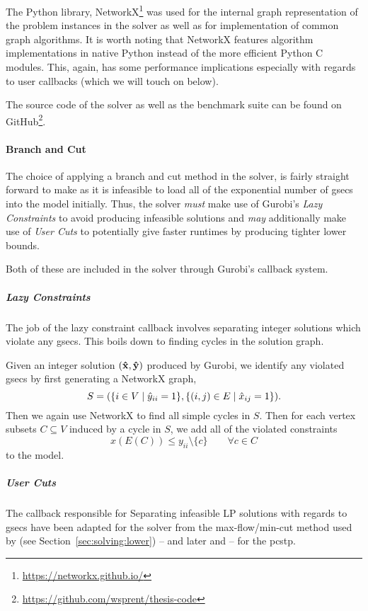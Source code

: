 The Python library,
NetworkX\footnote{\url{https://networkx.github.io/}} \citep{hagberg2008exploring}
was used for the internal graph representation of the
problem instances in the solver as well as for implementation of common
graph algorithms. It is worth noting that NetworkX features algorithm implementations
in native Python instead of the more efficient Python C modules. This, again, has some
performance implications especially with regards to user callbacks (which we will
 touch on below).

The source code of the solver as well as the benchmark suite
can be found on GitHub\footnote{\url{https://github.com/wsprent/thesis-code}}.

\paragraph{Branch and Cut}
The choice of applying a branch and cut method in the solver, is fairly straight
forward to make as it is infeasible to load all of the exponential number of
\glspl{gsec} into the model initially. Thus, the solver
\textit{must} make use of
Gurobi's \textit{Lazy Constraints} to avoid producing infeasible solutions
and \textit{may} additionally make use of \textit{User Cuts} to potentially
give faster runtimes by producing tighter lower bounds.

Both of these are included in the solver through Gurobi's callback system.
\subparagraph{Lazy Constraints}
The job of the lazy constraint callback involves separating integer solutions
which violate any \glspl{gsec}. This boils down to finding cycles in the solution
graph.

Given an integer solution $(\mathbf{\hat{x}}, \mathbf{\hat{y}})$ produced by Gurobi, we
identify any violated \glspl{gsec} by first generating a NetworkX graph,
$$S = (\{i \in V \mid \hat y_{ii} = 1 \}, \{ (i, j) \in E \mid \hat x_{ij} = 1\})\mathnormal{.}$$
Then we again use NetworkX to find all simple cycles in $S$. Then for each vertex
subsets $C \subseteq V$ induced by a cycle
in $S$, we add all of the violated constraints
$$x(E(C)) \leq y_{ii} \setminus \{c\} \qquad \forall c \in C$$
to the model.
\subparagraph{User Cuts}
The callback responsible for
Separating infeasible LP solutions with regards to \glspl{gsec}
have been adapted for the solver from the max-flow/min-cut  method used by \citet{lucena2004strong}
 (see Section~\ref{sec:solving:lower})
-- and later \citet{ljubic2005solving} and \citet{gamrath2017scip} -- for the \gls{pcstp}.

